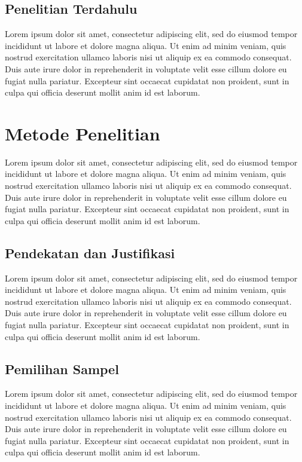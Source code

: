 \documentclass[12pt,hidelinks]{report}
\begin{document}
\section{Penelitian Terdahulu}
    Lorem ipsum dolor sit amet, consectetur adipiscing elit, sed do eiusmod tempor incididunt ut labore et dolore magna aliqua. Ut enim ad minim veniam, quis nostrud exercitation ullamco laboris nisi ut aliquip ex ea commodo consequat. Duis aute irure dolor in reprehenderit in voluptate velit esse cillum dolore eu fugiat nulla pariatur. Excepteur sint occaecat cupidatat non proident, sunt in culpa qui officia deserunt mollit anim id est laborum.

\chapter{Metode Penelitian}
    Lorem ipsum dolor sit amet, consectetur adipiscing elit, sed do eiusmod tempor incididunt ut labore et dolore magna aliqua. Ut enim ad minim veniam, quis nostrud exercitation ullamco laboris nisi ut aliquip ex ea commodo consequat. Duis aute irure dolor in reprehenderit in voluptate velit esse cillum dolore eu fugiat nulla pariatur. Excepteur sint occaecat cupidatat non proident, sunt in culpa qui officia deserunt mollit anim id est laborum.

\section{Pendekatan dan Justifikasi}
    Lorem ipsum dolor sit amet, consectetur adipiscing elit, sed do eiusmod tempor incididunt ut labore et dolore magna aliqua. Ut enim ad minim veniam, quis nostrud exercitation ullamco laboris nisi ut aliquip ex ea commodo consequat. Duis aute irure dolor in reprehenderit in voluptate velit esse cillum dolore eu fugiat nulla pariatur. Excepteur sint occaecat cupidatat non proident, sunt in culpa qui officia deserunt mollit anim id est laborum. 
 
\section{Pemilihan Sampel}
    Lorem ipsum dolor sit amet, consectetur adipiscing elit, sed do eiusmod tempor incididunt ut labore et dolore magna aliqua. Ut enim ad minim veniam, quis nostrud exercitation ullamco laboris nisi ut aliquip ex ea commodo consequat. Duis aute irure dolor in reprehenderit in voluptate velit esse cillum dolore eu fugiat nulla pariatur. Excepteur sint occaecat cupidatat non proident, sunt in culpa qui officia deserunt mollit anim id est laborum. 
\end{document}

